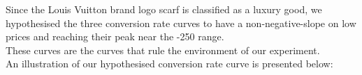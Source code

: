 Since the Louis Vuitton brand logo scarf is classified as a luxury good, we hypothesised the three conversion rate curves to have a non-negative-slope on low prices and reaching their peak near the -250 range. \\These curves are the curves that rule the environment of our experiment.\\An illustration of our hypothesised conversion rate curve is presented below:\newline
{} 
\clearpage